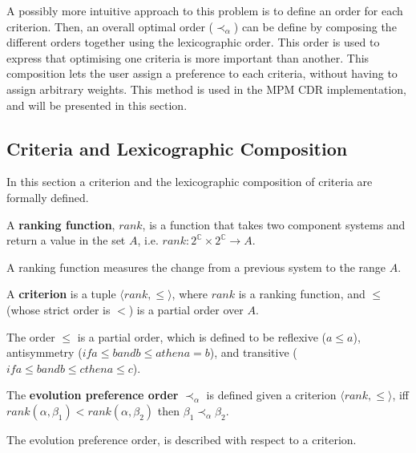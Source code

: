 A possibly more intuitive approach to this problem is to define an order for each criterion.
Then, an overall optimal order ($\prec_{\alpha}$) can be define by composing the different orders together using the lexicographic order.
This order is used to express that optimising one criteria is more important than another. 
This composition lets the user assign a preference to each criteria, without having to assign arbitrary weights.
This method is used in the MPM \citep{abate2011} CDR implementation, and will be presented in this section.

\subsection{Criteria and Lexicographic Composition}
In this section a criterion and the lexicographic composition of criteria are formally defined.

\begin{defs}
A \textbf{ranking function}, $rank$, is a function that takes two component systems and return a value in the set $A$, i.e. $rank : 2^{\mathbb{C}} \times 2^{\mathbb{C}} \rightarrow A$.
\end{defs}
A ranking function measures the change from a previous system to the range $A$.

\begin{defs}
\label{formal.defcriteria}
A \textbf{criterion} is a tuple $\langle rank, \leq \rangle$, where $rank$ is a ranking function, and $\leq$ (whose strict order is $<$) is a partial order over $A$.
\end{defs}
The order $\leq$ is a partial order, which is defined to be reflexive ($a \leq a$), antisymmetry ($if a \leq b and b \leq a then a = b$), and transitive ($if a \leq b and b \leq c then a \leq c$).

\begin{defs}
\label{formal.defcrittooptimal}
The \textbf{evolution preference order} $\prec_{\alpha}$ is defined given a criterion $\langle rank, \leq \rangle$, 
iff $rank(\alpha,\beta_1) < rank(\alpha,\beta_2)$ then $\beta_1 \prec_{\alpha} \beta_2$.
\end{defs}
The evolution preference order, is described with respect to a criterion.


